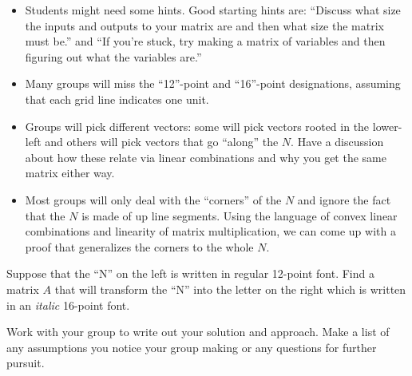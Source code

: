 \begin{iola}
	\begin{annotation}
		\begin{notes}
			\begin{itemize}
				\item Students might need some hints. Good starting hints are: ``Discuss
					what size the inputs and outputs to your matrix are and then what size
					the matrix must be.'' and ``If you're stuck, try making a matrix of variables
					and then figuring out what the variables are.''
				\item Many groups will miss the ``12''-point and ``16''-point designations, assuming that each
					grid line indicates one unit.
				\item Groups will pick different vectors: some will pick
					vectors rooted in the lower-left and others will pick vectors
					that go ``along'' the $N$. Have a discussion about how
					these relate via linear combinations and why you get the
					same matrix either way.
				\item Most groups will only deal with the ``corners'' of the $N$ and ignore
					the fact that the $N$ is made of up line segments. Using the language
					of convex linear combinations and linearity of matrix multiplication,
					we can come up with a proof that generalizes the corners to the whole $N$.
			\end{itemize}
		\end{notes}
	\end{annotation}

Suppose that the ``N'' on the left is written in regular 12-point font.  Find a matrix $A$ that will transform
	the ``N'' into the letter on the right which is written in an \emph{italic} 16-point font.

Work with your group to write out your solution and approach.  Make a list of any assumptions you
notice your group making or any questions for further pursuit.
\end{iola}


